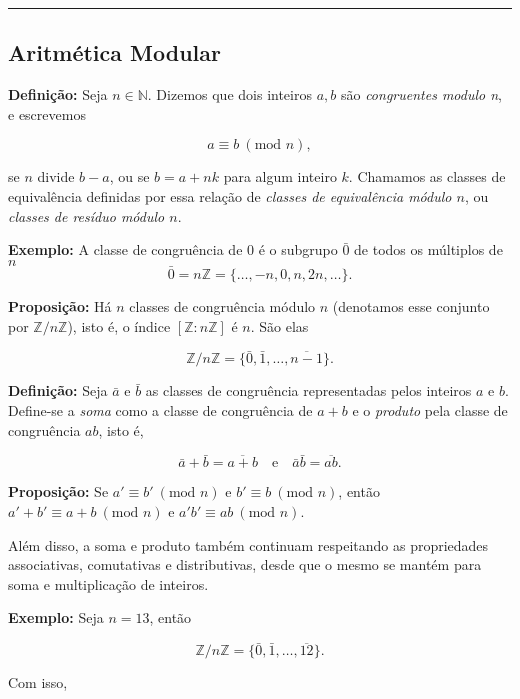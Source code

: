 \documentclass[11pt]{article}
\begin{document}
\begin{center}\rule{0.5\linewidth}{0.5pt}\end{center}

\hypertarget{aritmuxe9tica-modular}{%
\subsection{Aritmética Modular}\label{aritmuxe9tica-modular}}

\textbf{Definição:} Seja \(n\in\mathbb{N}\). Dizemos que dois inteiros
\(a,b\) são \emph{congruentes modulo n}, e escrevemos

\[ a \equiv b \ (\text{mod }n),\]

se \(n\) divide \(b-a\), ou se \(b = a + nk\) para algum inteiro \(k\).
Chamamos as classes de equivalência definidas por essa relação de
\emph{classes de equivalência módulo \(n\)}, ou \emph{classes de resíduo
módulo \(n\)}.

\textbf{Exemplo:} A classe de congruência de 0 é o subgrupo \(\bar{0}\)
de todos os múltiplos de \(n\)
\[\bar{0} = n\mathbb{Z} = \{\dots,-n,0,n,2n, \dots\}.\]

\textbf{Proposição:} Há \(n\) classes de congruência módulo \(n\)
(denotamos esse conjunto por \(\mathbb{Z}/n\mathbb{Z}\)), isto é, o
índice \([\mathbb{Z}:n\mathbb{Z}]\) é \(n\). São elas

\[\mathbb{Z}/n\mathbb{Z} =  \{\bar{0}, \bar{1},\dots,\overline{n - 1}\}.\]

\textbf{Definição:} Seja \(\bar a\) e \(\bar b\) as classes de
congruência representadas pelos inteiros \(a\) e \(b\). Define-se a
\emph{soma} como a classe de congruência de \(a+b\) e o \emph{produto}
pela classe de congruência \(ab\), isto é,

\[\bar a + \bar b = \overline{a+b} \quad \text{e}\quad \bar a\bar b = \overline{ab}.\]

\textbf{Proposição:} Se \(a' \equiv b'\ (\text{mod }n)\) e
\(b'\equiv b\ (\text{mod }n)\), então
\(a' + b' \equiv a+b\ (\text{mod }n)\) e
\(a'b' \equiv ab \ (\text{mod }n)\).

Além disso, a soma e produto também continuam respeitando as
propriedades associativas, comutativas e distributivas, desde que o
mesmo se mantém para soma e multiplicação de inteiros.

\textbf{Exemplo:} Seja \(n = 13\), então

\[\mathbb{Z}/n\mathbb{Z} =  \{\bar{0}, \bar{1},\dots,\overline{12}\}.\]

Com isso,
\end{document}
